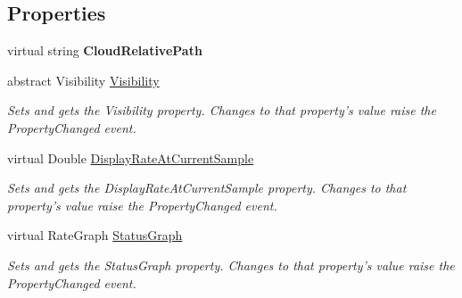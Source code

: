 \subsection*{Properties}
\begin{DoxyCompactItemize}
\item 
\hypertarget{class_cloud_api_public_1_1_event_message_receiver_1_1_status_1_1_c_l_status_file_transfer_base_3_01_t_01_4_a7de7c334812ac98e5bad2df2dd966a25}{virtual string {\bfseries Cloud\-Relative\-Path}}\label{class_cloud_api_public_1_1_event_message_receiver_1_1_status_1_1_c_l_status_file_transfer_base_3_01_t_01_4_a7de7c334812ac98e5bad2df2dd966a25}

\item 
abstract Visibility \hyperlink{class_cloud_api_public_1_1_event_message_receiver_1_1_status_1_1_c_l_status_file_transfer_base_3_01_t_01_4_a03be91031e22a9fc794d05391b26f29e}{Visibility}
\begin{DoxyCompactList}\small\item\em Sets and gets the Visibility property. Changes to that property's value raise the Property\-Changed event. \end{DoxyCompactList}\item 
virtual Double \hyperlink{class_cloud_api_public_1_1_event_message_receiver_1_1_status_1_1_c_l_status_file_transfer_base_3_01_t_01_4_ad7f354c525c4060e21a1e646d3f2a1d2}{Display\-Rate\-At\-Current\-Sample}
\begin{DoxyCompactList}\small\item\em Sets and gets the Display\-Rate\-At\-Current\-Sample property. Changes to that property's value raise the Property\-Changed event. \end{DoxyCompactList}\item 
virtual Rate\-Graph \hyperlink{class_cloud_api_public_1_1_event_message_receiver_1_1_status_1_1_c_l_status_file_transfer_base_3_01_t_01_4_af999e868dc7c4d8cbd3f997b8352427f}{Status\-Graph}
\begin{DoxyCompactList}\small\item\em Sets and gets the Status\-Graph property. Changes to that property's value raise the Property\-Changed event. \end{DoxyCompactList}\item 

\end{DoxyCompactItemize}
